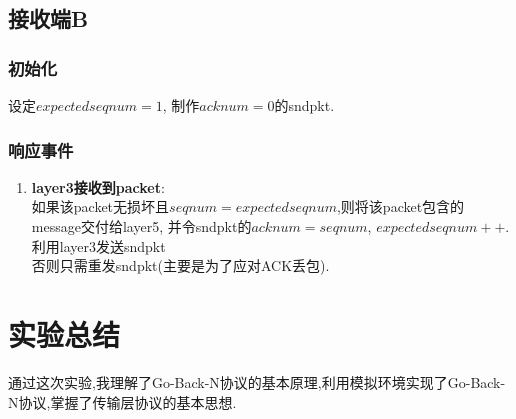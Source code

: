 \documentclass[a4paper,11pt]{article}
\begin{document}
\subsection{接收端B}
\subsubsection{初始化}
设定$expectedseqnum=1$, 制作$acknum = 0$的sndpkt.
\subsubsection{响应事件}
\begin{enumerate}
    \item 
\textbf{layer3接收到packet}:\\
如果该packet无损坏且$seqnum = expectedseqnum$,则将该packet包含的message交付给layer5,
并令sndpkt的$acknum=seqnum$, $expectedseqnum++$.利用layer3发送sndpkt\\
否则只需重发sndpkt(主要是为了应对ACK丢包).\\
\end{enumerate}
\section{实验总结}
通过这次实验,我理解了Go-Back-N协议的基本原理,利用模拟环境实现了Go-Back-N协议,掌握了传输层协议的基本思想.
\end{document}
